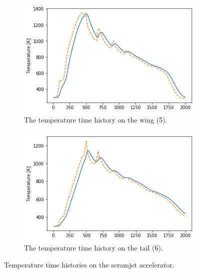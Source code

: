 \begin{figure}[!ht]
\begin{subfigure}{.5\textwidth}
	\end{subfigure}
	\begin{subfigure}{.5\textwidth}
		\centering
		\includegraphics[width=0.99\linewidth]{figures/A1_uncertainty-analysis/TPos3Return}
		\caption{The temperature time history on the wing (\textcolor{black}{5}).}
		
	\end{subfigure}
	\begin{subfigure}{.5\textwidth}
		\centering
		\includegraphics[width=0.99\linewidth]{figures/A1_uncertainty-analysis/TPos4Return}
		\caption{The temperature time history on the tail (\textcolor{black}{6}).}
		
	\end{subfigure}
	\caption{Temperature time histories on the scramjet accelerator.}
	\label{fig:TrajTemp}
\end{figure}

